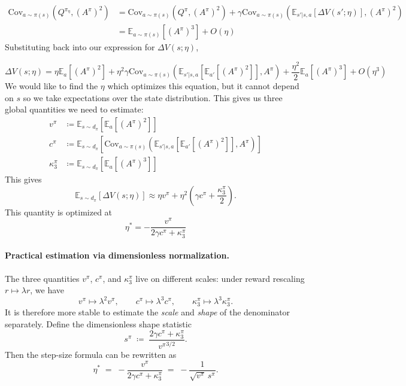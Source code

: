 \documentclass{article}
\theoremstyle{plain}
\theoremstyle{definition}
\theoremstyle{remark}
\newcommand{\E}{\mathbb{E}}
\begin{document}
\begin{align}
    \mathrm{Cov}_{a\sim\pi(s)}(Q^{\pi_\eta},(A^\pi)^2) 
    &= \mathrm{Cov}_{a\sim\pi(s)}(Q^\pi,(A^\pi)^2) + \gamma\mathrm{Cov}_{a\sim\pi(s)}(\E_{s'|s,a}[\Delta V(s';\eta)],(A^\pi)^2)\nonumber\\
    &= \E_{a\sim\pi(s)}[(A^\pi)^3] + O(\eta)
\end{align}
Substituting back into our expression for $\Delta V(s;\eta)$,

\begin{equation}
  \Delta V(s;\eta) = \eta\E_a[(A^\pi)^2] + \eta^2\gamma\mathrm{Cov}_{a\sim\pi(s)}(\E_{s'|s,a}[\E_{a'}[(A^\pi)^2]],A^\pi) + \frac{\eta^2}{2}\E_a[(A^\pi)^3] + O(\eta^3)
\end{equation}
We would like to find the $\eta$ which optimizes this equation, but it cannot depend on $s$ so we take expectations over the state distribution. This gives us three global quantities we need to estimate:
\begin{align}
    v^\pi &\coloneqq \E_{s\sim d_\pi}[\E_a[(A^\pi)^2]]\nonumber\\
    c^\pi &\coloneqq \E_{s\sim d_\pi}[\mathrm{Cov}_{a\sim\pi(s)}(\E_{s'|s,a}[\E_{a'}[(A^\pi)^2]],A^\pi)]\nonumber\\
    \kappa_3^\pi &\coloneqq \E_{s\sim d_\pi}[\E_a[(A^\pi)^3]]\nonumber
\end{align}
This gives
\begin{equation}
  \E_{s\sim d_\pi}[\Delta V(s;\eta)] \approx \eta v^\pi + \eta^2\left(\gamma c^\pi + \frac{\kappa_3^\pi}{2}\right).
\end{equation}
This quantity is optimized at
\begin{equation}\label{eq:app-eta-star}
  \boxed{\;\eta^* = -\frac{v^\pi}{2\gamma c^\pi + \kappa_3^\pi}\;}
\end{equation}

\paragraph{Practical estimation via dimensionless normalization.}
The three quantities $v^\pi$, $c^\pi$, and $\kappa_3^\pi$ live on different scales: under reward rescaling $r \mapsto \lambda r$, we have
\[
  v^\pi \mapsto \lambda^2 v^\pi,
  \qquad
  c^\pi \mapsto \lambda^3 c^\pi,
  \qquad
  \kappa_3^\pi \mapsto \lambda^3 \kappa_3^\pi.
\]
It is therefore more stable to estimate the \emph{scale} and \emph{shape} of the denominator separately. Define the dimensionless shape statistic
\begin{equation}
  s^\pi
  \;\coloneqq\;
  \frac{2\gamma c^\pi + \kappa_3^\pi}{{v^\pi}^{3/2}}.
\end{equation}
Then the step-size formula can be rewritten as
\begin{equation}
  \eta^*
  \;=\;
  -\frac{v^\pi}{2\gamma c^\pi + \kappa_3^\pi}
  \;=\;
  -\frac{1}{\sqrt{v^\pi}\,s^\pi}.
\end{equation}
\end{document}
